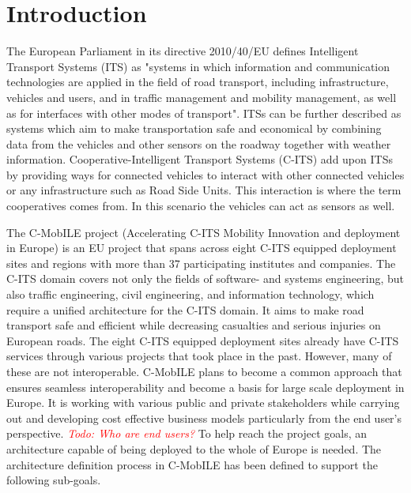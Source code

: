 \documentclass[conference]{IEEEtran}
\newcommand{\todo}[1]{\textcolor{red}{\emph{Todo: #1}}}
\begin{document}
\section{Introduction}

The European Parliament in its directive 2010/40/EU \cite{ec} defines Intelligent Transport Systems (ITS) as "systems in which information and communication technologies are applied in the field of road transport, including infrastructure, vehicles and users, and in traffic management and mobility management, as well as for interfaces with other modes of transport".
ITSs can be further described as systems which aim to make transportation safe and economical by combining data from the vehicles and other sensors on the roadway together with weather information.
Cooperative-Intelligent Transport Systems (C-ITS) \cite{c-its} add upon ITSs by providing ways for connected vehicles to interact with other connected vehicles or any infrastructure such as Road Side Units.
This interaction is where the term cooperatives comes from.
In this scenario the vehicles can act as sensors as well.

The C-MobILE project (Accelerating C-ITS Mobility Innovation and deployment in Europe) is an EU project that spans across eight C-ITS equipped deployment sites and regions with more than 37 participating institutes and companies.
The C-ITS domain covers not only the fields of software- and systems engineering, but also traffic engineering, civil engineering, and information technology, which require a unified architecture for the C-ITS domain.
It aims to make road transport safe and efficient while decreasing casualties and serious injuries on European roads.
The eight C-ITS equipped deployment sites already have C-ITS services through various projects that took place in the past.
However, many of these are not interoperable.
C-MobILE plans to become a common approach that ensures seamless interoperability and become a basis for large scale deployment in Europe.
It is working with various public and private stakeholders while carrying out and developing cost effective business models particularly from the end user's perspective. \todo{Who are end users?}
To help reach the project goals, an architecture capable of being deployed to the whole of Europe is needed.
The architecture definition process in C-MobILE has been defined to support the following sub-goals.
\end{document}
